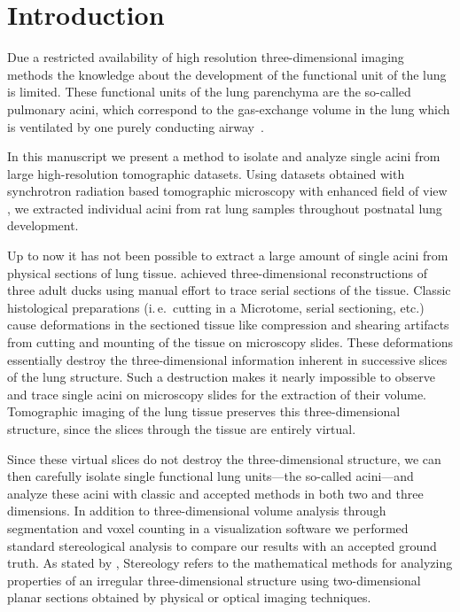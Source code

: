 \documentclass[%
	paper=a4,%
	abstract=true,%
	]{scrartcl}
\newcommand{\ie}{i.\,e.\ }
\begin{document}
\clearpage
\section{Introduction}
Due a restricted availability of high resolution three-dimensional imaging methods the knowledge about the development of the functional unit of the lung is limited. These functional units of the lung parenchyma are the so-called pulmonary acini, which correspond to the gas-exchange volume in the lung which is ventilated by one purely conducting airway~\cite{Rodriguez1987}.

In this manuscript we present a method to isolate and analyze single acini from large high-resolution tomographic datasets. Using datasets obtained with synchrotron radiation based tomographic microscopy with enhanced field of view \cite{Haberthuer2010a}, we extracted individual acini from rat lung samples throughout postnatal lung development. 

Up to now it has not been possible to extract a large amount of single acini from physical sections of lung tissue. \citet{Woodward2005} achieved three-dimensional reconstructions of three adult ducks using manual effort to trace serial sections of the tissue. Classic histological preparations (\ie cutting in a Microtome, serial sectioning, etc.) cause deformations in the sectioned tissue like compression and shearing artifacts from cutting and mounting of the tissue on microscopy slides. These deformations essentially destroy the three-dimensional information inherent in successive slices of the lung structure. Such a destruction makes it nearly impossible to observe and trace single acini on microscopy slides for the extraction of their volume. Tomographic imaging of the lung tissue preserves this three-dimensional structure, since the slices through the tissue are entirely virtual.

Since these virtual slices do not destroy the three-dimensional structure, we can then carefully isolate single functional lung units---the so-called acini---and analyze these acini with classic and accepted methods in both two and three dimensions. In addition to three-dimensional volume analysis through segmentation and voxel counting in a visualization software we performed standard stereological analysis \cite{Hsia2010} to compare our results with an accepted ground truth. As stated by \citet{Hsia2010}, Stereology refers to the mathematical methods for analyzing properties of an irregular three-dimensional structure using two-dimensional planar sections obtained by physical or optical imaging techniques.
\end{document}
